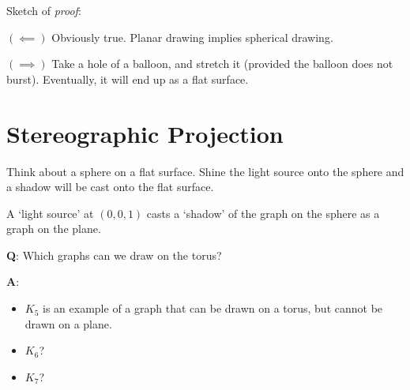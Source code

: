 Sketch of \emph{proof}:

$ (\impliedby) $ Obviously true. Planar drawing implies spherical drawing.

$ (\implies) $ Take a hole of a balloon, and stretch it (provided the balloon
does not burst). Eventually, it will end up as a flat surface.

\section{Stereographic Projection}
Think about a sphere on a flat surface. Shine the light source onto the sphere
and a shadow will be cast onto the flat surface.

A `light source' at $ (0,0,1) $ casts a `shadow' of the graph on the sphere as
a graph on the plane.

\textbf{Q}: Which graphs can we draw on the torus?

\textbf{A}:
\begin{itemize}
    \item $ K_5 $ is an example of a graph that can be drawn on
          a torus, but cannot be drawn on a plane.
    \item $ K_6 $?
    \item $ K_7 $?
\end{itemize}
